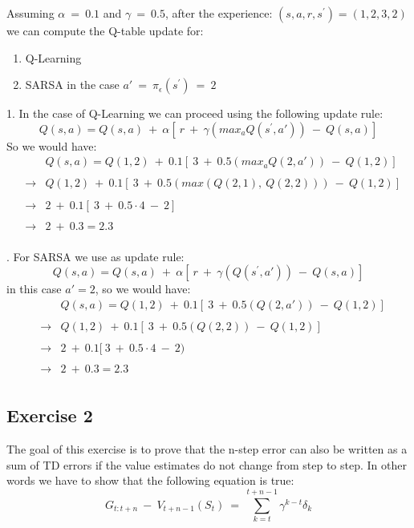 \documentclass[10pt,a4paper]{article}
\begin{document}
\noindent Assuming $\alpha \:=\: 0.1$ and $\gamma \:=\: 0.5$, after the experience: $(s, a, r, s^{\prime}) = (1,2,3,2)$ we can compute the Q-table update for:
\begin{enumerate}
    \item Q-Learning 
    \item SARSA in the case $a' \:=\: \pi_{\epsilon}(s^{\prime}) \:=\: 2$
\end{enumerate} 
1. In the case of Q-Learning we can proceed using the following update rule:
\begin{equation*}
    Q(s,a) = Q(s,a) \:+\: \alpha [ \:r \:+\: \gamma(max_{a}Q(s^{\prime},a')) \:-\: Q(s,a)]
\end{equation*}
So we would have:
\begin{align*}
    && Q(s,a) = Q(1,2) \:+\: 0.1 [ \:3 \:+\: 0.5(max_{a}Q(2,a')) \:-\: Q(1,2)] \\
    && \\
    &\rightarrow& Q(1,2) \:+\: 0.1 [ \:3 \:+\: 0.5(max(Q(2,1), \:Q(2,2))) \:-\: Q(1,2)] \\
    && \\
    &\rightarrow&2 \:+\: 0.1 [ \:3 \:+\: 0.5\cdot4 \:-\: 2] \\
    && \\
    &\rightarrow&2 \:+\: 0.3 = 2.3 \\
\end{align*}
\vspace{5pt}

. For SARSA we use as update rule:
\begin{equation*}
    Q(s,a) = Q(s,a) \:+\: \alpha [ \:r \:+\: \gamma(Q(s^{\prime},a')) \:-\: Q(s,a)]
\end{equation*}
in this case $a'=2$, so we would have:
\begin{align*}
    && Q(s,a) = Q(1,2) \:+\: 0.1 [ \:3 \:+\: 0.5(Q(2,a'))\:-\: Q(1,2)] \\
    && \\
    &\rightarrow& Q(1,2) \:+\: 0.1 [ \:3 \:+\: 0.5(Q(2,2))\:-\: Q(1,2)] \\
    && \\
    &\rightarrow&2 \:+\: 0.1 [ \:3 \:+\: 0.5\cdot4 \:-\: 2) \\
    && \\
    &\rightarrow&2 \:+\: 0.3 = 2.3 \\
\end{align*}
\newpage


\subsection{Exercise 2}
The goal of this exercise is to prove that the n-step error can also be written as a sum of TD errors if the value estimates do not
change from step to step. In other words we have to show that the following equation is true:
\begin{equation}
    G_{t:t+n} \:-\: V_{t+n-1}(S_t) \:=\: \sum_{k=t}^{t+n-1} \gamma^{k-t} \delta_{k}
\end{equation}
\vspace{5pt}
\end{document}
